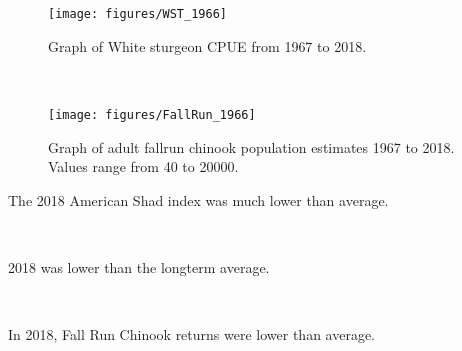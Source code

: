 \documentclass[
]{book}
\begin{document}
\begin{panel-grid}
\begin{columns-nocenter}
\begin{column800}
\begin{expand}

\begin{figure}
\texttt{[image: figures/WST\_1966]} \caption{Graph of White sturgeon CPUE from 1967 to 2018. }\label{fig:unnamed-chunk-131}
\end{figure}

\end{expand}

\end{column800}

\begin{column40}

~

\end{column40}

\begin{column800}

\begin{expand}

\begin{figure}
\texttt{[image: figures/FallRun\_1966]} \caption{Graph of adult fallrun chinook population estimates 1967 to 2018. Values range from 40 to 20000.}\label{fig:unnamed-chunk-132}
\end{figure}

\end{expand}

\end{column800}

\end{columns-nocenter}

\begin{columns-nocenter}

\begin{column800}

The 2018 American Shad index was much lower than average.

\end{column800}

\begin{column40}

~

\end{column40}

\begin{column800}

2018 was lower than the longterm average.

\end{column800}

\begin{column40}

~

\end{column40}

\begin{column800}

In 2018, Fall Run Chinook returns were lower than average.

\end{column800}

\end{columns-nocenter}

\end{panel-grid}
\end{document}
